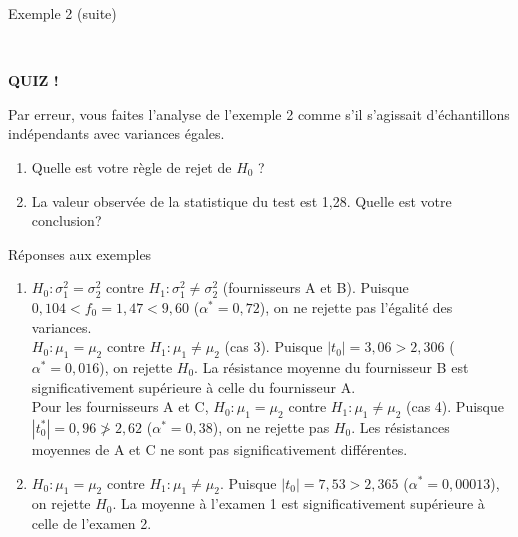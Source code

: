 \documentclass{BeamerTemplate}
\begin{document}
\begin{frame}[t]{Exemple 2 (suite)}

{\ }
\end{frame}


\begin{frame}[t]{ }

\centerline{\LARGE\bf \alert{QUIZ !}}
\bigskip

Par erreur, vous faites l'analyse de l'exemple 2 comme s'il s'agissait d'échantillons indépendants avec variances égales.
\vspace{7mm}

\begin{enumerate}\itemsep 9mm
\item Quelle est votre règle de rejet de $H_0$ ?
\item La valeur observée de la statistique du test est 1,28. Quelle est votre conclusion?
\end{enumerate}

\end{frame}


\begin{frame}[t]{Réponses aux exemples}

{\scriptsize

\begin{enumerate}
  \item  $H_0:\sigma_1^2=\sigma_2^2$ contre $H_1:\sigma_1^2\ne\sigma_2^2$ (fournisseurs A et B). Puisque $0,104<f_0=1,47<9,60$ ($\alpha^*=0,72$), on ne rejette pas l'égalité des variances.\\
      $H_0:\mu_1=\mu_2$ contre $H_1:\mu_1\ne\mu_2$ (cas 3). Puisque $|t_0|=3,06>2,306$ ($\alpha^*=0,016$), on rejette $H_0$. La résistance moyenne du fournisseur B est significativement supérieure à celle du fournisseur A.\\
      Pour les fournisseurs A et C, $H_0:\mu_1=\mu_2$ contre $H_1:\mu_1\ne\mu_2$ (cas 4). Puisque $|t_0^*|=0,96\not>2,62$ ($\alpha^*=0,38$), on ne rejette pas $H_0$. Les résistances moyennes de A et C ne sont pas significativement différentes.
  \item $H_0:\mu_1=\mu_2$ contre $H_1:\mu_1\ne\mu_2$. Puisque $|t_0|=7,53>2,365$ ($\alpha^*=0,00013$), on  rejette $H_0$. La moyenne à l'examen 1 est significativement supérieure à celle de l'examen 2.
 \end{enumerate}
 }
\end{frame}
\end{document}
